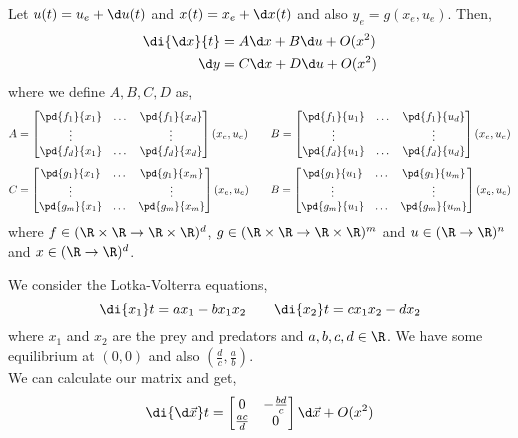 Let $u(t) = u_e + \d u(t)$ and $x(t) = x_e + \d x(t)$ and also $y_e = g(x_e, u_e)$. Then,
\begin{align*}
  \di {\d x}{t} &= A\d x + B\d u + O(x^2)\\
  \d y &= C\d x + D \d u + O(x^2)
\end{align*}
where we define $A, B, C, D$ as,
$$ A = \begin{bmatrix}
  \pd {f_1}{x_1} & \dots & \pd{f_1}{x_d}\\
  \vdots & & \vdots \\
  \pd{f_d}{x_1} &\dots & \pd{f_d}{x_d}
\end{bmatrix}(x_e, u_e) \qquad B = \begin{bmatrix}
  \pd {f_1}{u_1} & \dots & \pd{f_1}{u_d}\\
  \vdots & & \vdots \\
  \pd{f_d}{u_1} &\dots & \pd{f_d}{u_d}
\end{bmatrix} (x_e, u_e) $$
$$ C = \begin{bmatrix}
  \pd {g_1}{x_1} & \dots & \pd{g_1}{x_m}\\
  \vdots & & \vdots \\
  \pd{g_m}{x_1} &\dots & \pd{g_m}{x_m}
\end{bmatrix}(x_e, u_e) \qquad B = \begin{bmatrix}
  \pd {g_1}{u_1} & \dots & \pd{g_1}{u_m}\\
  \vdots & & \vdots \\
  \pd{g_m}{u_1} &\dots & \pd{g_m}{u_m}
\end{bmatrix} (x_e, u_e) $$
where $f \in (\R\times\R \to \R\times\R)^d$, $g \in (\R\times\R \to \R\times\R)^m$ and $u \in (\R \to \R)^n$ and $x \in (\R \to \R)^d$.

\begin{eg}
  We consider the Lotka-Volterra equations,
  $$ \di {x_1} t = ax_1 - bx_1x_2 \qquad \di {x_2} t = cx_1x_2 - dx_2 $$
  where $x_1$ and $x_2$ are the prey and predators and $a, b, c, d \in \R$. We have some equilibrium at $(0, 0)$ and also $\left( \frac{d}{c}, \frac{a}{b} \right)$.\\
  We can calculate our matrix and get,
  $$ \di {\d\vec x} t = \begin{bmatrix}
    0 & -\frac{bd}{c} \\ \frac{ac}{d} & 0
  \end{bmatrix} \d\vec{x} + O(x^2)$$
\end{eg}


